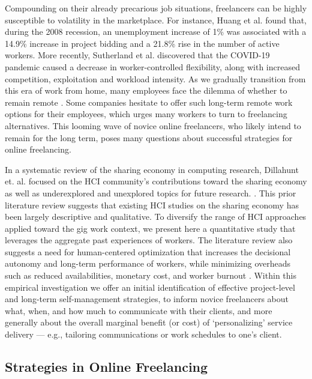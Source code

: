{Compounding on their already} precarious job situation{s, freelancers} can be highly susceptible to volatility in the marketplace. For instance, Huang et al. \cite{huang2020unemployment} found that, during the 2008 recession, an unemployment increase of 1\% was associated with a 14.9\% increase in project bidding and a 21.8\% rise in the number of active workers. More recently,  Sutherland et al. \cite{precarity} discovered that the COVID-19 pandemic caused a decrease in worker-controlled flexibility, along with increased competition, exploitation and workload intensity. 
As we gradually transition from this era of work from home, many employees face the dilemma of whether to remain remote \cite{Barrero2020-sf}. Some companies hesitate to offer such long-term remote work options for their employees, which urges many workers to turn to freelancing alternatives. This looming wave of novice online freelancers, who likely intend to remain for the long term, poses many questions about successful strategies for {online} freelancing. 

{In a systematic review of the sharing economy in computing research, Dillahunt et. al. focused on the HCI community's contributions toward the sharing economy as well as underexplored and unexplored topics for future research. \cite{Dillahunt_Wang_Wheeler_Cheng_Hecht_Zhu_2017}.} 
{ This prior literature review suggests that existing HCI studies on the sharing economy has been largely descriptive and qualitative.
{To diversify the range of HCI approaches applied toward the gig work context, we present here a quantitative study that leverages the aggregate past experiences of workers.} The literature review also suggests a need for human-centered optimization that increases the decisional autonomy and long-term performance of workers, while minimizing overheads such as reduced availabilities, monetary cost, and worker burnout \cite{Dillahunt_Wang_Wheeler_Cheng_Hecht_Zhu_2017}.} Within this empirical investigation we offer an initial identification of effective {project-level and long-term} self-management strategies, to inform novice freelancers about what, when, and how much to communicate with their clients, and more generally about the overall marginal benefit (or cost) of `personalizing' service delivery --- e.g., tailoring communications or work schedules to one's client. 

\subsection{{Strategies in Online Freelancing}}

